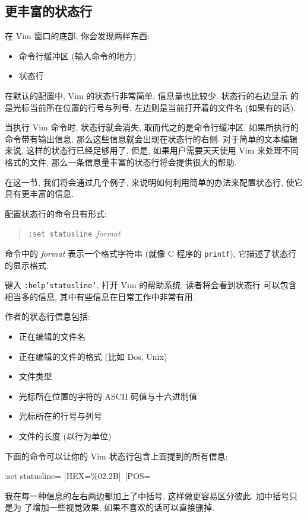 \begin{warning}
\section{更丰富的状态行}
\label{sec:a_more_informative_status_line}
在 Vim 窗口的底部, 你会发现两样东西:
\begin{itemize}
    \item 命令行缓冲区 (输入命令的地方)
    \item 状态行
\end{itemize}
在默认的配置中, Vim 的状态行非常简单, 信息量也比较少. 状态行的右边显示
的是光标当前所在位置的行号与列号, 左边则是当前打开着的文件名 (如果有的话).

当执行 Vim 命令时, 状态行就会消失, 取而代之的是命令行缓冲区. 如果所执行的
命令带有输出信息, 那么这些信息就会出现在状态行的右侧.
对于简单的文本编辑来说, 这样的状态行已经足够用了. 但是, 如果用户需要天天使用
Vim 来处理不同格式的文件, 那么一条信息量丰富的状态行将会提供很大的帮助.

在这一节, 我们将会通过几个例子, 来说明如何利用简单的办法来配置状态行, 使它
具有更丰富的信息.

配置状态行的命令具有形式:
\begin{quotation}
\texttt{:set statusline}\ \textit{format}
\end{quotation}
命令中的 \textit{format} 表示一个格式字符串 (就像 C 程序的 \texttt{printf}),
它描述了状态行的显示格式.

键入 \texttt{:help'statusline'}, 打开 Vim 的帮助系统, 读者将会看到状态行
可以包含相当多的信息, 其中有些信息在日常工作中非常有用.

作者的状态行信息包括:
\begin{itemize}
    \item 正在编辑的文件名
    \item 正在编辑的文件的格式 (比如 Dos, Unix)
    \item 文件类型
    \item 光标所在位置的字符的 ASCII 码值与十六进制值
    \item 光标所在的行号与列号
    \item 文件的长度 (以行为单位)
\end{itemize}
下面的命令可以让你的 Vim 状态行包含上面提到的所有信息:
\begin{vimcmd}
:set statusline=%
 [HEX=\%02.2B]\ [POS=%
\end{vimcmd}
我在每一种信息的左右两边都加上了中括号, 这样做更容易区分彼此. 加中括号只是为
了增加一些视觉效果, 如果不喜欢的话可以直接删掉.


\end{warning}
